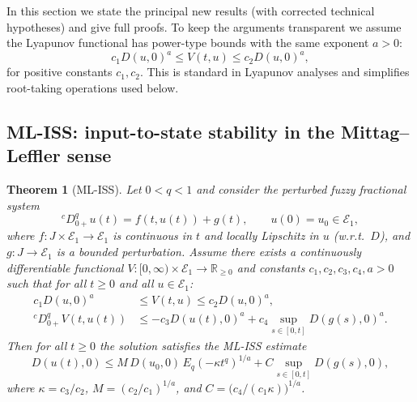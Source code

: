 \documentclass[11pt,a4paper]{article}
\theoremstyle{plain}
\newtheorem{theorem}{Theorem}[section]
\theoremstyle{definition}
\theoremstyle{remark}
\newcommand{\E}{\mathcal{E}_1}
\newcommand{\Haus}{D}
\begin{document}
	In this section we state the principal new results (with corrected technical hypotheses) and give full proofs. 
	To keep the arguments transparent we assume the Lyapunov functional has power-type bounds with the same exponent \(a>0\):
	\[
	c_1\Haus(u,0)^a \le V(t,u) \le c_2\Haus(u,0)^a,
	\]
	for positive constants \(c_1,c_2\). This is standard in Lyapunov analyses and simplifies root-taking operations used below.
	
	\subsection{ML-ISS: input-to-state stability in the Mittag--Leffler sense}
	
	\begin{theorem}[ML-ISS]\label{thm:ML-ISS}
		Let \(0<q<1\) and consider the perturbed fuzzy fractional system
		\[
		{}^cD_{0+}^q u(t)=f(t,u(t))+g(t),\qquad u(0)=u_0\in\E,
		\]
		where \(f:J\times\E\to\E\) is continuous in \(t\) and locally Lipschitz in \(u\) (w.r.t.\ \(\Haus\)), and \(g:J\to\E\) is a bounded perturbation. Assume there exists a continuously differentiable functional \(V:[0,\infty)\times\E\to\mathbb{R}_{\ge0}\) and constants \(c_1,c_2,c_3,c_4,a>0\) such that for all \(t\ge0\) and all \(u\in\E\):
		\begin{align}
			c_1\Haus(u,0)^a &\le V(t,u)\le c_2\Haus(u,0)^a,\label{V-bounds}\\
			{}^cD_{0+}^q V(t,u(t)) &\le -c_3\Haus(u(t),0)^a + c_4\sup_{s\in[0,t]}\Haus(g(s),0)^a.\label{V-derivative-ineq}
		\end{align}
		Then for all \(t\ge0\) the solution satisfies the ML-ISS estimate
		\begin{equation}\label{ISS-estimate}
			\Haus(u(t),0)\le M\,\Haus(u_0,0)\,E_q(-\kappa t^q)^{1/a}+C\sup_{s\in[0,t]}\Haus(g(s),0),
		\end{equation}
		where \(\kappa=c_3/c_2\), \(M=(c_2/c_1)^{1/a}\), and \(C=\big(c_4/(c_1\kappa)\big)^{1/a}\).
	\end{theorem}
	
\end{document}
